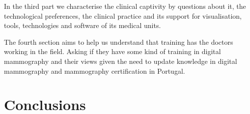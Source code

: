 In the third part we characterise the clinical captivity by questions about it, the technological preferences, the clinical practice and its support for visualisation, tools, technologies and software of its medical units.

The fourth section aims to help us understand that training has the doctors working in the field. Asking if they have some kind of training in digital mammography and their views given the need to update knowledge in digital mammography and mammography certification in Portugal.

\clearpage

\section{Conclusions}



\clearpage

\begin{thebibliography}{}
\bibitem{}
\end{thebibliography}





